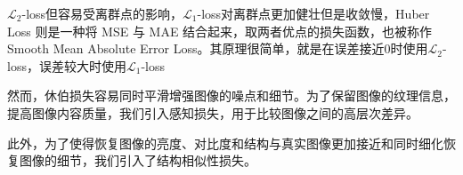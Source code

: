 \documentclass[a4paper]{ctexart}
\begin{document}
%	

	$\mathcal{L}_2$-loss但容易受离群点的影响，$\mathcal{L}_1$-loss对离群点更加健壮但是收敛慢，Huber Loss 则是一种将 MSE 与 MAE 结合起来，取两者优点的损失函数，也被称作 Smooth Mean Absolute Error Loss。其原理很简单，就是在误差接近0时使用$\mathcal{L}_2$-loss，误差较大时使用$\mathcal{L}_1$-loss
	
	然而，休伯损失容易同时平滑增强图像的噪点和细节。为了保留图像的纹理信息，提高图像内容质量，我们引入感知损失，用于比较图像之间的高层次差异。%
	
	
	
	此外，为了使得恢复图像的亮度、对比度和结构与真实图像更加接近和同时细化恢复图像的细节，我们引入了结构相似性损失。%
	
	
\end{document}
